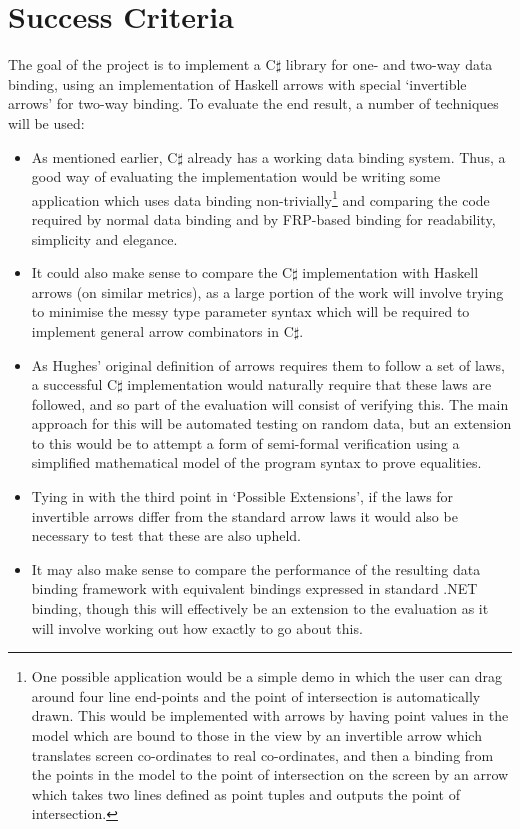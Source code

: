 \section*{Success Criteria}
	The goal of the project is to implement a C$\sharp$ library for one- and two-way data binding, using an implementation of Haskell arrows with special `invertible arrows' for two-way binding. To evaluate the end result, a number of techniques will be used:
	
	\begin{itemize}
		\item As mentioned earlier, C$\sharp$ already has a working data binding system. Thus, a good way of evaluating the implementation would be writing some application which uses data binding non-trivially\footnote{One possible application would be a simple demo in which the user can drag around four line end-points and the point of intersection is automatically drawn. This would be implemented with arrows by having point values in the model which are bound to those in the view by an invertible arrow which translates screen co-ordinates to real co-ordinates, and then a binding from the points in the model to the point of intersection on the screen by an arrow which takes two lines defined as point tuples and outputs the point of intersection.} and comparing the code required by normal data binding and by FRP-based binding for readability, simplicity and elegance.
		
		\item It could also make sense to compare the C$\sharp$ implementation with Haskell arrows (on similar metrics), as a large portion of the work will involve trying to minimise the messy type parameter syntax which will be required to implement general arrow combinators in C$\sharp$.
		
		\item As Hughes' original definition of arrows requires them to follow a set of laws, a successful C$\sharp$ implementation would naturally require that these laws are followed, and so part of the evaluation will consist of verifying this. The main approach for this will be automated testing on random data, but an extension to this would be to attempt a form of semi-formal verification using a simplified mathematical model of the program syntax to prove equalities.
		
		\item Tying in with the third point in `Possible Extensions', if the laws for invertible arrows differ from the standard arrow laws it would also be necessary to test that these are also upheld.
		
		\item It may also make sense to compare the performance of the resulting data binding framework with equivalent bindings expressed in standard .NET binding, though this will effectively be an extension to the evaluation as it will involve working out how exactly to go about this.
	\end{itemize}

